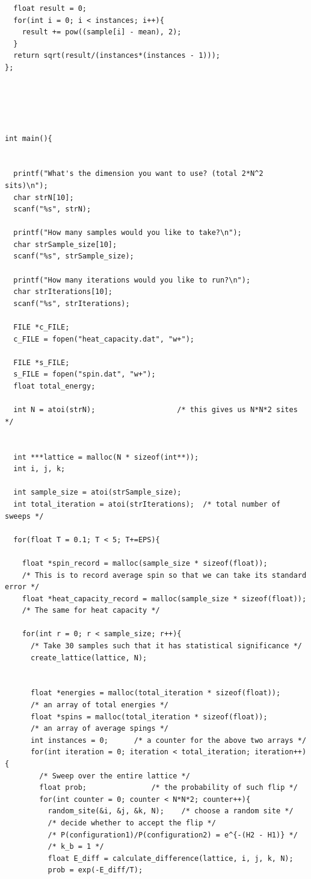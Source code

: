 \documentclass{article}
\begin{document}
\begin{verbatim}
  float result = 0;
  for(int i = 0; i < instances; i++){
    result += pow((sample[i] - mean), 2);
  }
  return sqrt(result/(instances*(instances - 1)));
};





int main(){


  printf("What's the dimension you want to use? (total 2*N^2 sits)\n");
  char strN[10];
  scanf("%s", strN);

  printf("How many samples would you like to take?\n");
  char strSample_size[10];
  scanf("%s", strSample_size);

  printf("How many iterations would you like to run?\n");
  char strIterations[10];
  scanf("%s", strIterations);

  FILE *c_FILE;
  c_FILE = fopen("heat_capacity.dat", "w+");

  FILE *s_FILE;
  s_FILE = fopen("spin.dat", "w+");
  float total_energy;

  int N = atoi(strN);                   /* this gives us N*N*2 sites */


  int ***lattice = malloc(N * sizeof(int**));
  int i, j, k;

  int sample_size = atoi(strSample_size);
  int total_iteration = atoi(strIterations);  /* total number of sweeps */

  for(float T = 0.1; T < 5; T+=EPS){

    float *spin_record = malloc(sample_size * sizeof(float));
    /* This is to record average spin so that we can take its standard error */
    float *heat_capacity_record = malloc(sample_size * sizeof(float));
    /* The same for heat capacity */

    for(int r = 0; r < sample_size; r++){
      /* Take 30 samples such that it has statistical significance */
      create_lattice(lattice, N);


      float *energies = malloc(total_iteration * sizeof(float));
      /* an array of total energies */
      float *spins = malloc(total_iteration * sizeof(float));
      /* an array of average spings */
      int instances = 0;      /* a counter for the above two arrays */
      for(int iteration = 0; iteration < total_iteration; iteration++){
        /* Sweep over the entire lattice */
        float prob;               /* the probability of such flip */
        for(int counter = 0; counter < N*N*2; counter++){
          random_site(&i, &j, &k, N);    /* choose a random site */
          /* decide whether to accept the flip */
          /* P(configuration1)/P(configuration2) = e^{-(H2 - H1)} */
          /* k_b = 1 */
          float E_diff = calculate_difference(lattice, i, j, k, N);
          prob = exp(-E_diff/T);


\end{verbatim}
\end{document}
